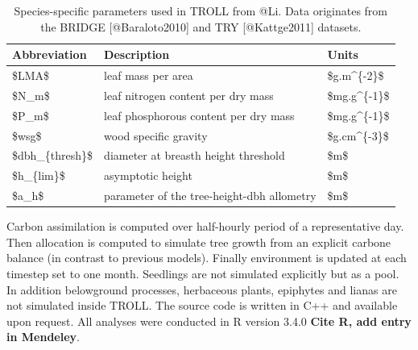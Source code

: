 \documentclass[]{article}
\theoremstyle{definition}
\theoremstyle{definition}
\theoremstyle{remark}
\begin{document}
\begin{table}

\caption{\label{tab:traits}Species-specific parameters used in TROLL from @Li. Data originates from the BRIDGE [@Baraloto2010] and TRY [@Kattge2011] datasets.}
\centering
\begin{tabular}[t]{l|l|l}
\hline
Abbreviation & Description & Units\\
\hline
\$LMA\$ & leaf mass per area & \$g.m\textasciicircum{}\{-2\}\$\\
\hline
\$N\_m\$ & leaf nitrogen content per dry mass & \$mg.g\textasciicircum{}\{-1\}\$\\
\hline
\$P\_m\$ & leaf phosphorous content per dry mass & \$mg.g\textasciicircum{}\{-1\}\$\\
\hline
\$wsg\$ & wood specific gravity & \$g.cm\textasciicircum{}\{-3\}\$\\
\hline
\$dbh\_\{thresh\}\$ & diameter at breasth height threshold & \$m\$\\
\hline
\$h\_\{lim\}\$ & asymptotic height & \$m\$\\
\hline
\$a\_h\$ & parameter of the tree-height-dbh allometry & \$m\$\\
\hline
\end{tabular}
\end{table}

Carbon assimilation is computed over half-hourly period of a
representative day. Then allocation is computed to simulate tree growth
from an explicit carbone balance (in contrast to previous models).
Finally environment is updated at each timestep set to one month.
Seedlings are not simulated explicitly but as a pool. In addition
belowground processes, herbaceous plants, epiphytes and lianas are not
simulated inside TROLL. The source code is written in C++ and available
upon request. All analyses were conducted in R version 3.4.0
\textbf{Cite R, add entry in Mendeley}.
\end{document}
